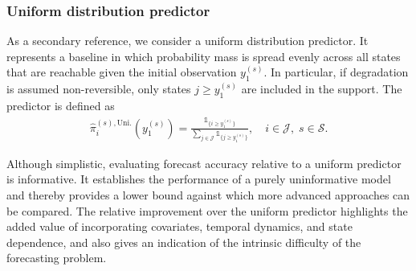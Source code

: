 \subsubsection{Uniform distribution predictor} \label{sec:uniform_predictor}
As a secondary reference, we consider a uniform distribution predictor. It represents a baseline in which probability mass is spread evenly across all states that are reachable given the initial observation $y_1^{(s)}$. In particular, if degradation is assumed non-reversible, only states $j \geq y_1^{(s)}$ are included in the support. The predictor is defined as
\begin{align}
    \widehat{\pi}^{(s),\text{Uni.}}_i(y_1^{(s)}) 
    = \frac{\mathds{1}_{ \{ i \geq y_1^{(s)} \} }}{\sum_{j \in \mathcal{J}} \mathds{1}_{ \{ j \geq y_1^{(s)} \} }}, 
    \quad i \in \mathcal{J}, \; s \in \mathcal{S}. \label{eq:uniform_predictor}
\end{align}

Although simplistic, evaluating forecast accuracy relative to a uniform predictor is informative. It establishes the performance of a purely uninformative model and thereby provides a lower bound against which more advanced approaches can be compared. The relative improvement over the uniform predictor highlights the added value of incorporating covariates, temporal dynamics, and state dependence, and also gives an indication of the intrinsic difficulty of the forecasting problem.




